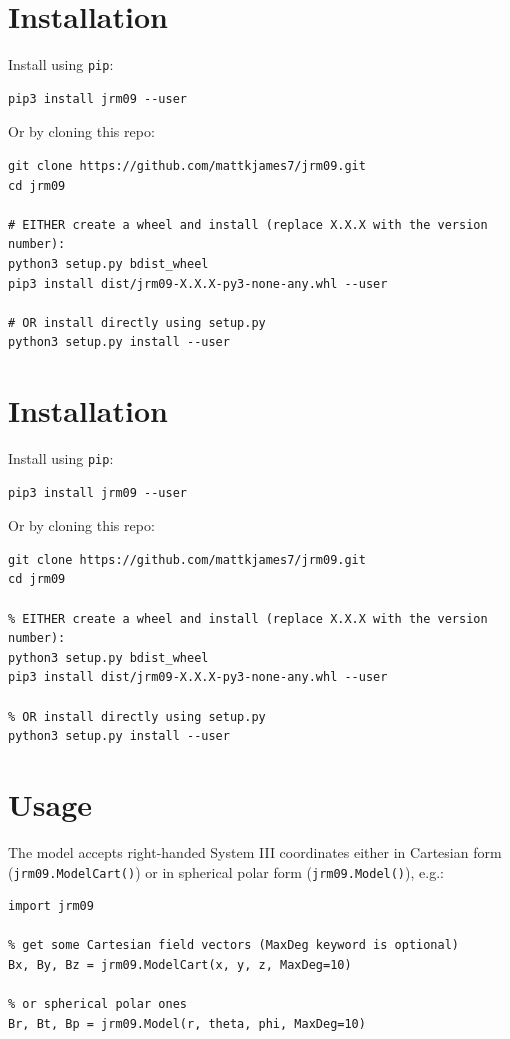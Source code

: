 	\section{Installation}

	Install using \texttt{pip}:
	
	\begin{verbatim}
pip3 install jrm09 --user
	\end{verbatim}
	
	Or by cloning this repo:
	
	\begin{verbatim}
git clone https://github.com/mattkjames7/jrm09.git
cd jrm09
	
# EITHER create a wheel and install (replace X.X.X with the version number):
python3 setup.py bdist_wheel
pip3 install dist/jrm09-X.X.X-py3-none-any.whl --user
	
# OR install directly using setup.py
python3 setup.py install --user
	\end{verbatim}
	\section{Installation}

Install using \texttt{pip}:

\begin{verbatim}
pip3 install jrm09 --user
\end{verbatim}

Or by cloning this repo:

\begin{verbatim}
git clone https://github.com/mattkjames7/jrm09.git
cd jrm09

% EITHER create a wheel and install (replace X.X.X with the version number):
python3 setup.py bdist_wheel
pip3 install dist/jrm09-X.X.X-py3-none-any.whl --user

% OR install directly using setup.py
python3 setup.py install --user
\end{verbatim}

\section{Usage}

The model accepts right-handed System III coordinates either in Cartesian form (\texttt{jrm09.ModelCart()}) or in spherical polar form (\texttt{jrm09.Model()}), e.g.:

\begin{verbatim}
import jrm09

% get some Cartesian field vectors (MaxDeg keyword is optional)
Bx, By, Bz = jrm09.ModelCart(x, y, z, MaxDeg=10)

% or spherical polar ones
Br, Bt, Bp = jrm09.Model(r, theta, phi, MaxDeg=10)
\end{verbatim}

